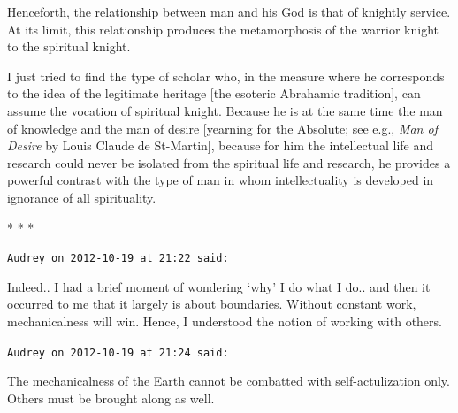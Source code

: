 \begin{quotex}
Henceforth, the relationship between man and his God is that of knightly service. At its limit, this relationship produces the metamorphosis of the warrior knight to the spiritual knight.

I just tried to find the type of scholar who, in the measure where he corresponds to the idea of the legitimate heritage [the esoteric Abrahamic tradition], can assume the vocation of spiritual knight. Because he is at the same time the man of knowledge and the man of desire [yearning for the Absolute; see e.g., \emph{Man of Desire} by Louis Claude de St-Martin], because for him the intellectual life and research could never be isolated from the spiritual life and research, he provides a powerful contrast with the type of man in whom intellectuality is developed in ignorance of all spirituality. 

\end{quotex}



\begin{center}* * *\end{center}

\begin{footnotesize}\begin{sffamily}



\texttt{Audrey on 2012-10-19 at 21:22 said: }

Indeed.. I had a brief moment of wondering `why' I do what I do.. and then it occurred to me that it largely is about boundaries. Without constant work, mechanicalness will win. Hence, I understood the notion of working with others.


\hfill

\texttt{Audrey on 2012-10-19 at 21:24 said: }

The mechanicalness of the Earth cannot be combatted with self-actulization only. Others must be brought along as well.


\end{sffamily}\end{footnotesize}
